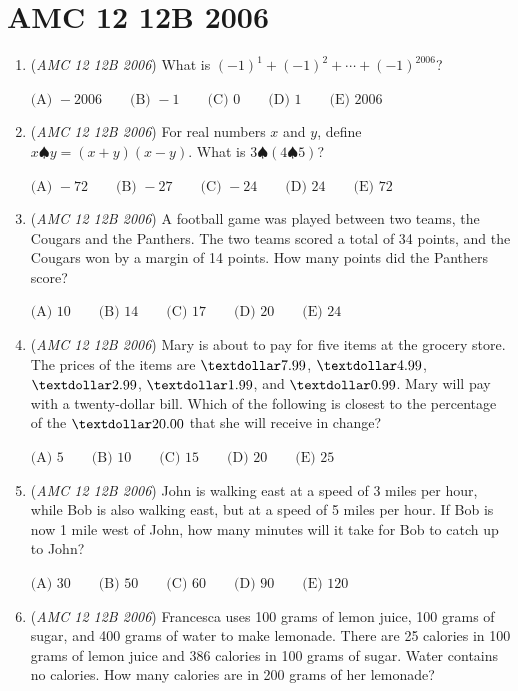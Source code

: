 \section{AMC 12 12B 2006}
        \begin{enumerate}
        	\item (\textit{AMC 12 12B 2006}) What is $( - 1)^1 + ( - 1)^2 + \cdots + ( - 1)^{2006}$?


 $\text {(A) } - 2006 \qquad \text {(B) } - 1 \qquad \text {(C) } 0 \qquad \text {(D) } 1 \qquad \text {(E) } 2006$


	\item (\textit{AMC 12 12B 2006}) For real numbers $x$ and $y$, define $x\spadesuit y = (x + y)(x - y)$.  What is $3\spadesuit(4\spadesuit 5)$?


 $\text {(A) } - 72 \qquad \text {(B) } - 27 \qquad \text {(C) } - 24 \qquad \text {(D) } 24 \qquad \text {(E) } 72$


	\item (\textit{AMC 12 12B 2006}) A football game was played between two teams, the Cougars and the Panthers.  The two teams scored a total of 34 points, and the Cougars won by a margin of 14 points.  How many points did the Panthers score?


 $\text {(A) } 10 \qquad \text {(B) } 14 \qquad \text {(C) } 17 \qquad \text {(D) } 20 \qquad \text {(E) } 24$


	\item (\textit{AMC 12 12B 2006}) Mary is about to pay for five items at the grocery store.  The prices of the items are $\textdollar7.99$, $\textdollar4.99$, $\textdollar2.99$, $\textdollar1.99$, and $\textdollar0.99$.  Mary will pay with a twenty-dollar bill.  Which of the following is closest to the percentage of the $\textdollar20.00$ that she will receive in change?


 $\text {(A) } 5 \qquad \text {(B) } 10 \qquad \text {(C) } 15 \qquad \text {(D) } 20 \qquad \text {(E) } 25$


	\item (\textit{AMC 12 12B 2006}) John is walking east at a speed of 3 miles per hour, while Bob is also walking east, but at a speed of 5 miles per hour.  If Bob is now 1 mile west of John, how many minutes will it take for Bob to catch up to John?


 $\text {(A) } 30 \qquad \text {(B) } 50 \qquad \text {(C) } 60 \qquad \text {(D) } 90 \qquad \text {(E) } 120$


	\item (\textit{AMC 12 12B 2006}) Francesca uses 100 grams of lemon juice, 100 grams of sugar, and 400 grams of water to make lemonade.  There are 25 calories in 100 grams of lemon juice and 386 calories in 100 grams of sugar.  Water contains no calories.  How many calories are in 200 grams of her lemonade?



\end{enumerate}
